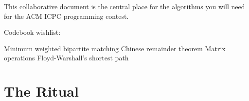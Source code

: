 \documentclass{article}
\title{\cTitle}
\author{\cAuthor}
\begin{document}
\maketitle


This collaborative document is the central place for the algorithms you will need for the ACM ICPC programming contest.

\tableofcontents

Codebook wishlist:

Minimum weighted bipartite matching
Chinese remainder theorem
Matrix operations
Floyd-Warshall's shortest path

\section*{The Ritual}
\end{document}
